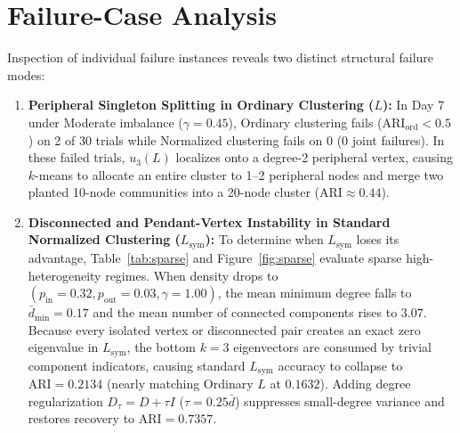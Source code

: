 \documentclass[10pt,twocolumn,a4paper]{article}
\begin{document}
\section{Failure-Case Analysis}
Inspection of individual failure instances reveals two distinct structural failure modes:
\begin{enumerate}\setlength{\itemsep}{1pt}\setlength{\parskip}{0pt}
    \item \textbf{Peripheral Singleton Splitting in Ordinary Clustering ($L$):} In Day 7 under Moderate imbalance ($\gamma=0.45$), Ordinary clustering fails ($\mathrm{ARI}_{\mathrm{ord}} < 0.5$) on 2 of 30 trials while Normalized clustering fails on 0 (0 joint failures). In these failed trials, $u_3(L)$ localizes onto a degree-2 peripheral vertex, causing $k$-means to allocate an entire cluster to 1--2 peripheral nodes and merge two planted 10-node communities into a 20-node cluster ($\mathrm{ARI} \approx 0.44$).
    \item \textbf{Disconnected and Pendant-Vertex Instability in Standard Normalized Clustering ($L_{\mathrm{sym}}$):} To determine when $L_{\mathrm{sym}}$ loses its advantage, Table~\ref{tab:sparse} and Figure~\ref{fig:sparse} evaluate sparse high-heterogeneity regimes. When density drops to $(p_{\mathrm{in}}=0.32, p_{\mathrm{out}}=0.03, \gamma=1.00)$, the mean minimum degree falls to $\bar{d}_{\min} = 0.17$ and the mean number of connected components rises to $3.07$. Because every isolated vertex or disconnected pair creates an exact zero eigenvalue in $L_{\mathrm{sym}}$, the bottom $k=3$ eigenvectors are consumed by trivial component indicators, causing standard $L_{\mathrm{sym}}$ accuracy to collapse to $\mathrm{ARI} = 0.2134$ (nearly matching Ordinary $L$ at $0.1632$). Adding degree regularization $D_\tau = D + \tau I$ ($\tau = 0.25\bar{d}$) suppresses small-degree variance and restores recovery to $\mathrm{ARI} = 0.7357$.
\end{enumerate}

\begin{table}[!htbp]
\centering
\caption{Sparse Peripheral Vulnerability Study (30 trials per regime). Standard $L_{\mathrm{sym}}$ breaks down when $d_{\min} \to 0$ and components $>1$, whereas regularized $L_\tau$ ($\tau=0.25\bar{d}$) maintains recovery.}
\label{tab:sparse}
\end{table}
\end{document}
